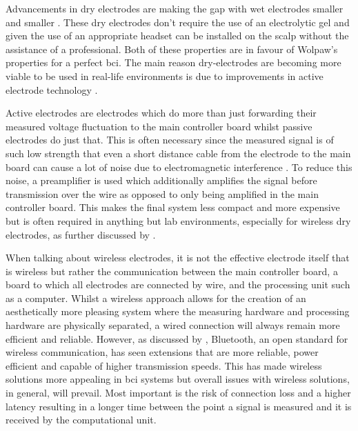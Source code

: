 Advancements in dry electrodes are making the gap with wet electrodes smaller and smaller \citep{wet_vs_dry, dry_electrode_status, wet_dry_comparison_experiment}.
These dry electrodes don't require the use of an electrolytic gel and given the use of an appropriate headset can be installed on the scalp without the assistance of a professional. 
Both of these properties are in favour of Wolpaw's properties for a perfect \gls{bci}.
The main reason dry-electrodes are becoming more viable to be used in real-life environments is due to improvements in active electrode technology \citep{wet_vs_dry}.

Active electrodes are electrodes which do more than just forwarding their measured voltage fluctuation to the main controller board whilst passive electrodes do just that.
This is often necessary since the measured signal is of such low strength that even a short distance cable from the electrode to the main board can cause a lot of noise due to electromagnetic interference \citep{active_electrode_explained}.
To reduce this noise, a preamplifier is used which additionally amplifies the signal before transmission over the wire as opposed to only being amplified in the main controller board.
This makes the final system less compact and more expensive but is often required in anything but lab environments, especially for wireless dry electrodes, as further discussed by \citet{wet_vs_dry}.

When talking about wireless electrodes, it is not the effective electrode itself that is wireless but rather the communication between the main controller board, a board to which all electrodes are connected by wire, and the processing unit such as a computer.
Whilst a wireless approach allows for the creation of an aesthetically more pleasing system where the measuring hardware and processing hardware are physically separated, a wired connection will always remain more efficient and reliable. 
However, as discussed by \citet{bluetooth_evaluation}, Bluetooth, an open standard for wireless communication, has seen extensions that are more reliable, power efficient and capable of higher transmission speeds.
This has made wireless solutions more appealing in \gls{bci} systems but overall issues with wireless solutions, in general, will prevail.
Most important is the risk of connection loss and a higher latency resulting in a longer time between the point a signal is measured and it is received by the computational unit.


